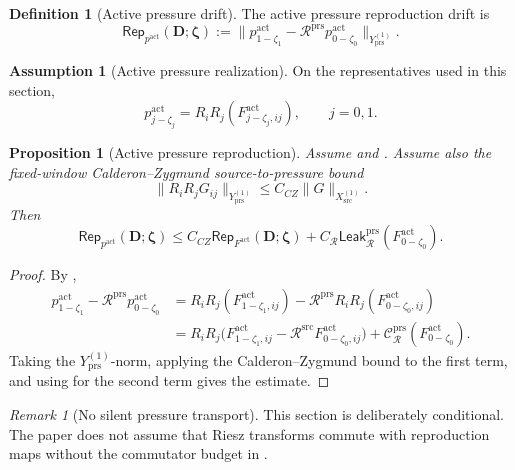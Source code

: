 \documentclass[11pt]{article}
\numberwithin{equation}{section}
\newtheorem{proposition}[proposition]{Proposition}
\theoremstyle{definition}
\newtheorem{definition}[definition]{Definition}
\newtheorem{assumption}[assumption]{Assumption}
\theoremstyle{remark}
\newtheorem{remark}[remark]{Remark}
\newcommand{\prs}{\mathrm{prs}}
\newcommand{\src}{\mathrm{src}}
\newcommand{\Leak}{\mathsf{Leak}}
\newcommand{\Rep}{\mathsf{Rep}}
\newcommand{\calC}{\mathcal C}
\newcommand{\calR}{\mathcal R}
\newcommand{\bD}{\mathbf D}
\newcommand{\bzeta}{\boldsymbol\zeta}
\newcommand{\Xsrc}{X_{\src}}
\newcommand{\Yprs}{Y_{\prs}}
\begin{document}
\begin{definition}[Active pressure drift]
\label{rep:def:active-pressure-drift}
The active pressure reproduction drift is
\[
    \Rep_{p^{\mathrm{act}}}(\bD;\bzeta)
    :=
    \|p^{\mathrm{act}}_{1-\zeta_1}
    -
    \calR^{\prs}p^{\mathrm{act}}_{0-\zeta_0}\|_{\Yprs^{(1)}}.
\]
\end{definition}

\begin{assumption}[Active pressure realization]
\label{rep:ass:active-pressure-realization}
On the representatives used in this section,
\[
    p^{\mathrm{act}}_{j-\zeta_j}
    =
    R_iR_j(F^{\mathrm{act}}_{j-\zeta_j,ij}),
    \qquad j=0,1.
\]
\end{assumption}

\begin{proposition}[Active pressure reproduction]
\label{rep:prop:active-pressure-reproduction}
Assume  and
.  Assume also the fixed-window
Calderon--Zygmund source-to-pressure bound
\[
    \|R_iR_j G_{ij}\|_{\Yprs^{(1)}}
    \le
    C_{CZ}\|G\|_{\Xsrc^{(1)}}.
\]
Then
\[
    \Rep_{p^{\mathrm{act}}}(\bD;\bzeta)
    \le
    C_{CZ}\Rep_{F^{\mathrm{act}}}(\bD;\bzeta)
    +
    C_{\calR}\Leak_{\calR}^{\prs}(F^{\mathrm{act}}_{0-\zeta_0}).
\]
\end{proposition}

\begin{proof}
By ,
\[
\begin{aligned}
    p^{\mathrm{act}}_{1-\zeta_1}
    -
    \calR^{\prs}p^{\mathrm{act}}_{0-\zeta_0}
    &=
    R_iR_j(F^{\mathrm{act}}_{1-\zeta_1,ij})
    -
    \calR^{\prs}R_iR_j(F^{\mathrm{act}}_{0-\zeta_0,ij})\\
    &=
    R_iR_j\bigl(
        F^{\mathrm{act}}_{1-\zeta_1,ij}
        -
        \calR^{\src}F^{\mathrm{act}}_{0-\zeta_0,ij}
    \bigr)
    +
    \calC_{\calR}^{\prs}(F^{\mathrm{act}}_{0-\zeta_0}).
\end{aligned}
\]
Taking the \(\Yprs^{(1)}\)-norm, applying the Calderon--Zygmund bound to the
first term, and using  for the second
term gives the estimate.
\end{proof}

\begin{remark}[No silent pressure transport]
This section is deliberately conditional.  The paper does not assume that
Riesz transforms commute with reproduction maps without the commutator budget
in .
\end{remark}
\end{document}

